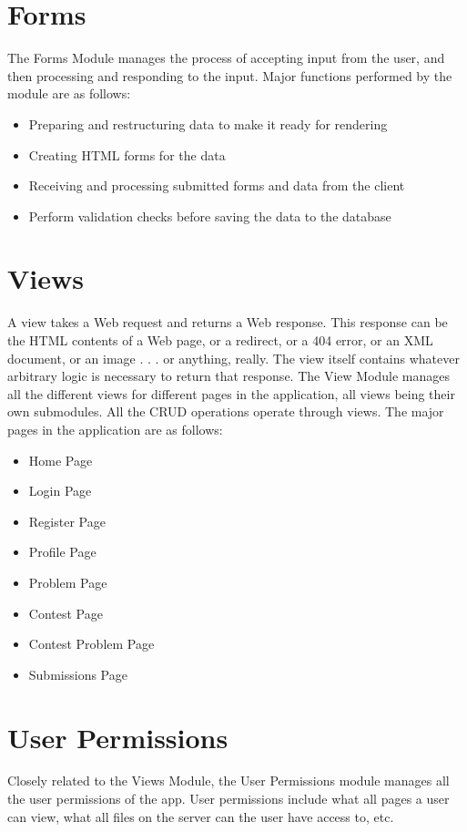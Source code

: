 \newpage

\section{Forms}
The Forms Module manages the process of accepting input from the user, and then processing and responding to the input. Major functions performed by the module are as follows:
\begin{itemize}
	\item Preparing and restructuring data to make it ready for rendering
	\item Creating HTML forms for the data
	\item Receiving and processing submitted forms and data from the client
	\item Perform validation checks before saving the data to the database
\end{itemize}

\section{Views}
A view takes a Web request and returns a Web response. This response can be the HTML contents of a Web page, or a redirect, or a 404 error, or an XML document, or an image . . . or anything, really. The view itself contains whatever arbitrary logic is necessary to return that response. The View Module manages all the different views for different pages in the application, all views being their own submodules. All the CRUD operations operate through views. The major pages in the application are as follows:
\begin{itemize}
	\item Home Page
	\item Login Page
	\item Register Page
	\item Profile Page
	\item Problem Page
	\item Contest Page
	\item Contest Problem Page
	\item Submissions Page
\end{itemize}

\section{User Permissions}
Closely related to the Views Module, the User Permissions module manages all the user permissions of the app. User permissions include what all pages a user can view, what all files on the server can the user have access to, etc.